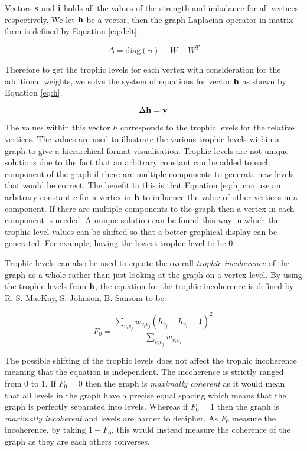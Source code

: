 Vectors $\bold{s}$ and $\bold{i}$ holds all the values of the strength and imbalance for all vertices respectively. We let $\bold{h}$ be a vector, then the graph Laplacian operator in matrix form is defined by Equation \ref{eq:delt}.  

\begin{equation} \label{eq:delt}
\Delta = \text{diag}(u) - W - W^T
\end{equation}

Therefore to get the trophic levels for each vertex with consideration for the additional weights, we solve the system of equations for vector $\bold{h}$ as shown by Equation \ref{eq:h}.

\begin{equation} \label{eq:h}
\Delta \bold{h} = \bold{v} 
\end{equation}

The values within this vector $h$ corresponds to the trophic levels for the relative vertices. The values are used to illustrate the various trophic levels within a graph to give a hierarchical format visualisation. Trophic levels are not unique solutions due to the fact that an arbitrary constant can be added to each component of the graph if there are multiple components to generate new levels that would be correct. The benefit to this is that Equation \ref{eq:h} can use an arbitrary constant $c$ for a vertex in $\bold{h}$ to influence the value of other vertices in a component. If there are multiple components to the graph then a vertex in each component is needed. A unique solution can be found this way in which the trophic level values can be shifted so that a better graphical display can be generated. For example, having the lowest trophic level to be 0. 

Trophic levels can also be used to equate the overall \emph{trophic incoherence} of the graph as a whole rather than just looking at the graph on a vertex level. By using the trophic levels from $\bold{h}$, the equation for the trophic incoherence is defined by R. S. MacKay, S. Johnson, B. Sansom \cite{johnson2020digraphs} to be:

\begin{equation}
F_0=\frac{\sum_{v_iv_j}w_{v_iv_j}(h_{v_j}-h_{v_i}-1)^2}{\sum_{v_iv_j}w_{v_iv_j}}
\end{equation}

The possible shifting of the trophic levels does not affect the trophic incoherence meaning that the equation is independent. The incoherence is strictly ranged from 0 to 1. If $F_0 = 0$  then the graph is \emph{maximally coherent} as it would mean that all levels in the graph have a precise equal spacing which means that the graph is perfectly separated into levels. Whereas if $F_0 = 1$ then the graph is \emph{maximally incoherent} and levels are harder to decipher. As $F_0$ measure the incoherence, by taking $1 - F_0$, this would instead measure the coherence of the graph as they are each others converses. 
\newline

